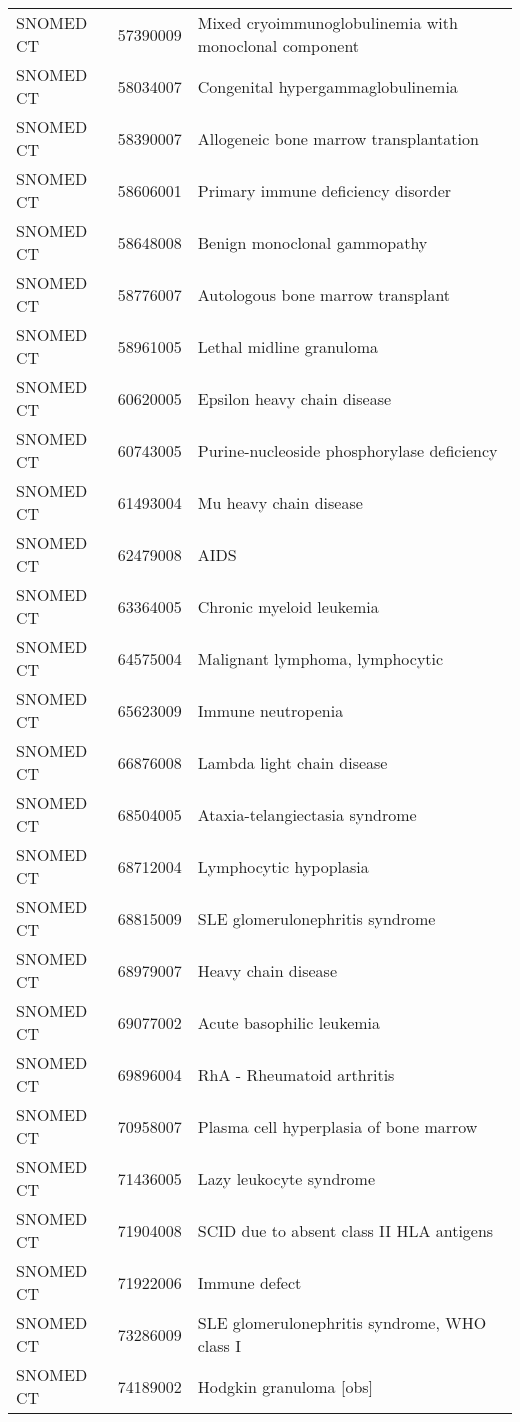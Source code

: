 \begin{table}[ht]
\begin{tabular}{lll}
  SNOMED CT & 57390009 & Mixed cryoimmunoglobulinemia with monoclonal component \\ 
  SNOMED CT & 58034007 & Congenital hypergammaglobulinemia \\ 
  SNOMED CT & 58390007 & Allogeneic bone marrow transplantation \\ 
  SNOMED CT & 58606001 & Primary immune deficiency disorder \\ 
  SNOMED CT & 58648008 & Benign monoclonal gammopathy \\ 
  SNOMED CT & 58776007 & Autologous bone marrow transplant \\ 
  SNOMED CT & 58961005 & Lethal midline granuloma \\ 
  SNOMED CT & 60620005 & Epsilon heavy chain disease \\ 
  SNOMED CT & 60743005 & Purine-nucleoside phosphorylase deficiency \\ 
  SNOMED CT & 61493004 & Mu heavy chain disease \\ 
  SNOMED CT & 62479008 & AIDS \\ 
  SNOMED CT & 63364005 & Chronic myeloid leukemia \\ 
  SNOMED CT & 64575004 & Malignant lymphoma, lymphocytic \\ 
  SNOMED CT & 65623009 & Immune neutropenia \\ 
  SNOMED CT & 66876008 & Lambda light chain disease \\ 
  SNOMED CT & 68504005 & Ataxia-telangiectasia syndrome \\ 
  SNOMED CT & 68712004 & Lymphocytic hypoplasia \\ 
  SNOMED CT & 68815009 & SLE glomerulonephritis syndrome \\ 
  SNOMED CT & 68979007 & Heavy chain disease \\ 
  SNOMED CT & 69077002 & Acute basophilic leukemia \\ 
  SNOMED CT & 69896004 & RhA - Rheumatoid arthritis \\ 
  SNOMED CT & 70958007 & Plasma cell hyperplasia of bone marrow \\ 
  SNOMED CT & 71436005 & Lazy leukocyte syndrome \\ 
  SNOMED CT & 71904008 & SCID due to absent class II HLA antigens \\ 
  SNOMED CT & 71922006 & Immune defect \\ 
  SNOMED CT & 73286009 & SLE glomerulonephritis syndrome, WHO class I \\ 
  SNOMED CT & 74189002 & Hodgkin granuloma [obs] \\ 

\end{tabular}
\end{table}
